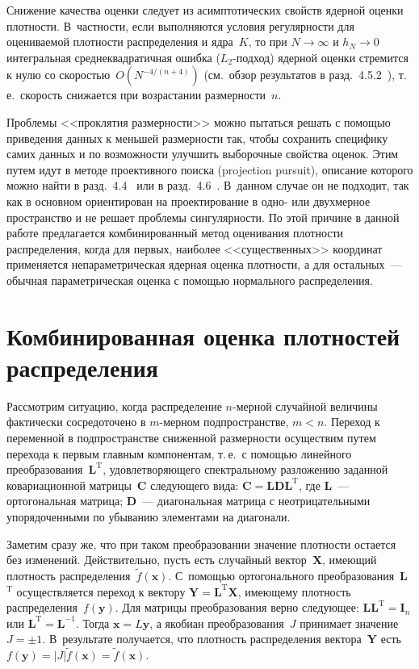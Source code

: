 \begin{multicols}{2}
      Снижение качества оценки следует из асимп\-то\-ти\-ческих свойств ядерной оценки плотности. 
В~частности, если выполняются условия регулярности для оцениваемой плотности распределения 
и ядра~$K$, то при $N\rightarrow\infty$ и $h_N\rightarrow 0$ интегральная среднеквадратичная 
ошибка ($L_2$-подход) ядерной оценки стремится к нулю со скоростью~$O(N^{-4/(n+4)})$ (см.\ 
обзор результатов в разд.~4.5.2~\cite{3kk}), т.\,е.\ скорость снижается при возрастании 
размерности~$n$. 
      
      Проблемы <<проклятия размерности>> можно пытаться решать с помощью приведения 
данных к меньшей размерности так, чтобы сохранить специфику самих данных и по возможности 
улучшить выборочные свойства оценок. Этим путем идут в методе проективного поиска 
(projection pursuit), описание которого можно найти в разд.~4.4~\cite{4kk} или в 
разд.~4.6~\cite{3kk}. В~данном случае он не подходит, так как в основном ориентирован на 
проектирование в одно- или двухмерное пространство и не решает проблемы сингулярности. По 
этой причине в данной работе предлагается комбинированный метод оценивания плотности 
распределения, когда для первых, наиболее <<существенных>> координат применяется 
непараметрическая ядерная оценка плотности, а для остальных~--- обычная параметрическая 
оценка с помощью нормального распределения.

\section{Комбинированная оценка плотностей распределения}

      Рассмотрим ситуацию, когда распределение $n$-мерной случайной величины фактически 
сосредоточено в $m$-мерном подпространстве, $m<n$. Переход к переменной в подпространстве 
сниженной размерности осуществим путем перехода к первым главным компонентам, т.\,е.\ с 
помощью линейного преобразования~$\mathbf{L}^{\mathrm{T}}$, удовлетворяющего спектральному 
разложению заданной ковариационной матрицы~\textbf{C} следующего вида: 
$\mathbf{C}=\mathbf{LDL}^{\mathrm{T}}$, где \textbf{L}~--- ортогональная матрица; \textbf{D}~--- 
диагональная матрица с неотрицательными упорядоченными по убыванию элементами на 
диагонали. 
      
      Заметим сразу же, что при таком преобразовании значение плотности остается без 
изменений. Действительно, пусть есть случайный вектор~\textbf{X}, имеющий плотность 
распределения~$\widetilde{f}(\mathbf{x})$. С~помощью ортогонального 
преобразования~\textbf{L}$^{\mathrm{T}}$ осуществляется переход к вектору 
$\mathbf{Y}=\mathbf{L}^{\mathrm{T}}\mathbf{X}$, имеющему плотность распределения~$f(\mathbf{y})$. Для 
матрицы преобразования верно следующее: $\mathbf{LL}^{\mathrm{T}}=\mathbf{I}_n$ или 
$\mathbf{L}^{\mathrm{T}}=\mathbf{L}^{-1}$. Тогда $\mathbf{x} =L\mathbf{y}$, а якобиан 
преобразования~$J$ принимает значение $J=\pm 1$. В~результате получается, что плотность 
распределения вектора~\textbf{Y} есть $f(\mathbf{y})=\vert J\vert \widetilde{f}(\mathbf{x})=\widetilde{f}(\mathbf{x})$.
      

\end{multicols}
